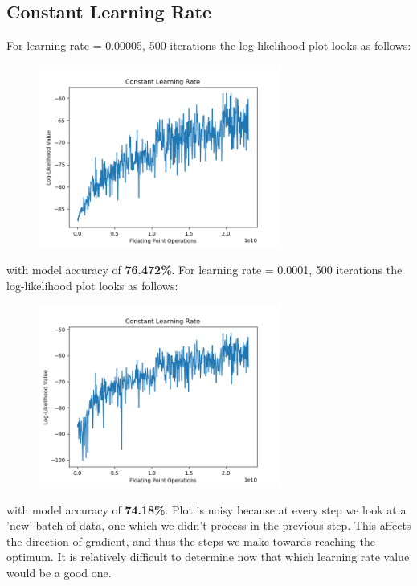 \documentclass[a4paper]{article}
\begin{document}
\subsection*{Constant Learning Rate}
For learning rate = 0.00005, 500 iterations the log-likelihood plot looks as follows:
\begin{figure}[h!]
\centering
\includegraphics[width=8cm,height=6cm]{b_clr_00005_500_76472.png}
\end{figure}

\noindent with model accuracy of \textbf{76.472\%}.
\vskip 0.1in
\noindent For learning rate = 0.0001, 500 iterations the log-likelihood plot looks as follows:

\begin{figure}[h!]
\centering
\includegraphics[width=8cm,height=6cm]{b_clr_0001_500_7418.png}
\end{figure}

\noindent with model accuracy of \textbf{74.18\%}.
\vskip 0.1in
\noindent Plot is noisy because at every step we look at a 'new' batch of data, one which we didn't process in the previous step. This affects the direction of gradient, and thus the steps we make towards reaching the optimum. It is relatively difficult to determine now that which learning rate value would be a good one. 
\end{document}
